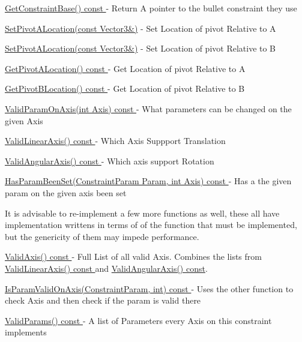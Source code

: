 \begin{DoxyItemize}
\item \hyperlink{classMezzanine_1_1TypedConstraint_a7aa13fc4448cf1fc32673bde4ec84767}{GetConstraintBase() const }-\/ Return A pointer to the bullet constraint they use
\item \hyperlink{classMezzanine_1_1TypedConstraint_a09aacdc6f424623cc3a2fdad9c1d0caf}{SetPivotALocation(const Vector3\&)} -\/ Set Location of pivot Relative to A
\item \hyperlink{classMezzanine_1_1TypedConstraint_a09aacdc6f424623cc3a2fdad9c1d0caf}{SetPivotALocation(const Vector3\&)} -\/ Set Location of pivot Relative to B
\item \hyperlink{classMezzanine_1_1TypedConstraint_af785319e62e274656f180ab80f5f8dd9}{GetPivotALocation() const }-\/ Get Location of pivot Relative to A
\item \hyperlink{classMezzanine_1_1TypedConstraint_a2c0984d3211b30756c7ec5263c99b014}{GetPivotBLocation() const }-\/ Get Location of pivot Relative to B
\item \hyperlink{classMezzanine_1_1TypedConstraint_a3f895880ea78984a088996e1950fddcc}{ValidParamOnAxis(int Axis) const }-\/ What parameters can be changed on the given Axis
\item \hyperlink{classMezzanine_1_1TypedConstraint_aa9cc59688e58329ce18cc3e024094602}{ValidLinearAxis() const }-\/ Which Axis Suppport Translation
\item \hyperlink{classMezzanine_1_1TypedConstraint_a09ecca761c4af51a8b41c056f6b15b30}{ValidAngularAxis() const }-\/ Which axis support Rotation
\item \hyperlink{classMezzanine_1_1TypedConstraint_a96a6b4c16521f24d72feea98044ef3a8}{HasParamBeenSet(ConstraintParam Param, int Axis) const }-\/ Has a the given param on the given axis been set
\end{DoxyItemize}

It is advisable to re-\/implement a few more functions as well, these all have implementation writtens in terms of of the function that must be implemented, but the genericity of them may impede performance.
\begin{DoxyItemize}
\item \hyperlink{classMezzanine_1_1TypedConstraint_a6fa3f1ead5840ca22071c5f7dce30bbd}{ValidAxis() const }-\/ Full List of all valid Axis. Combines the lists from \hyperlink{classMezzanine_1_1TypedConstraint_aa9cc59688e58329ce18cc3e024094602}{ValidLinearAxis() const }and \hyperlink{classMezzanine_1_1TypedConstraint_a09ecca761c4af51a8b41c056f6b15b30}{ValidAngularAxis() const}.
\item \hyperlink{classMezzanine_1_1TypedConstraint_aeaaffe002055651f3db3e9150fe5a114}{IsParamValidOnAxis(ConstraintParam, int) const }-\/ Uses the other function to check Axis and then check if the param is valid there
\item \hyperlink{classMezzanine_1_1TypedConstraint_a278d3baf36055e5d10a411139a2d2a7e}{ValidParams() const }-\/ A list of Parameters every Axis on this constraint implements 
\end{DoxyItemize}

